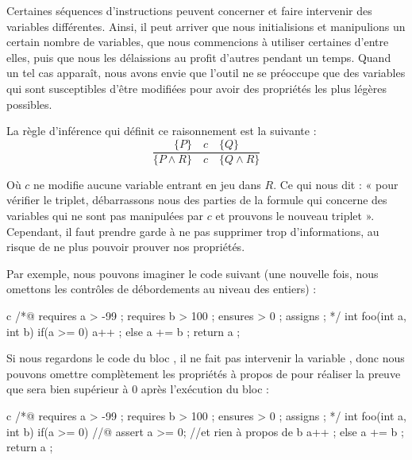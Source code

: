 \label{l3:statements-basic-constancy}


Certaines séquences d'instructions peuvent concerner et faire intervenir des 
variables différentes. Ainsi, il peut arriver que nous initialisions et manipulions
un certain nombre de variables, que nous commencions à utiliser certaines d'entre 
elles, puis que nous les délaissions au profit d'autres pendant un temps. Quand un
tel cas apparaît, nous avons envie que l'outil ne se préoccupe que des variables 
qui sont susceptibles d'être modifiées pour avoir des propriétés les plus légères 
possibles.



La règle d'inférence qui définit ce raisonnement est la suivante :
$$\dfrac{\{P\}\quad c\quad \{Q\}}{\{P \wedge R\}\quad c\quad \{Q \wedge R\}}$$



Où $c$ ne modifie aucune variable entrant en jeu dans $R$. Ce qui nous dit : « pour 
vérifier le triplet, débarrassons nous des parties de la formule qui concerne des
variables qui ne sont pas manipulées par $c$ et prouvons le nouveau triplet ». 
Cependant, il faut prendre garde à ne pas supprimer trop d'informations, au risque
de ne plus pouvoir prouver nos propriétés.



Par exemple, nous pouvons imaginer le code suivant (une nouvelle fois, nous omettons
les contrôles de débordements au niveau des entiers) :



\begin{CodeBlock}{c}
/*@
  requires a > -99 ;
  requires b > 100 ;
  ensures  \result > 0 ;
  assigns  \nothing ;
*/
int foo(int a, int b){
  if(a >= 0){
    a++ ;
  } else {
    a += b ;
  }
  return a ;
}
\end{CodeBlock}



Si nous regardons le code du bloc , il ne fait pas intervenir la variable
, donc nous pouvons omettre complètement les propriétés à propos de   pour
réaliser la preuve que  sera bien supérieur à 0 après l'exécution du bloc :



\begin{CodeBlock}{c}
/*@
  requires a > -99 ;
  requires b > 100 ;
  ensures  \result > 0 ;
  assigns  \nothing ;
*/
int foo(int a, int b){
  if(a >= 0){
    //@ assert a >= 0; //et rien à propos de b
    a++ ;
  } else {
    a += b ;
  }
  return a ;
}
\end{CodeBlock}



